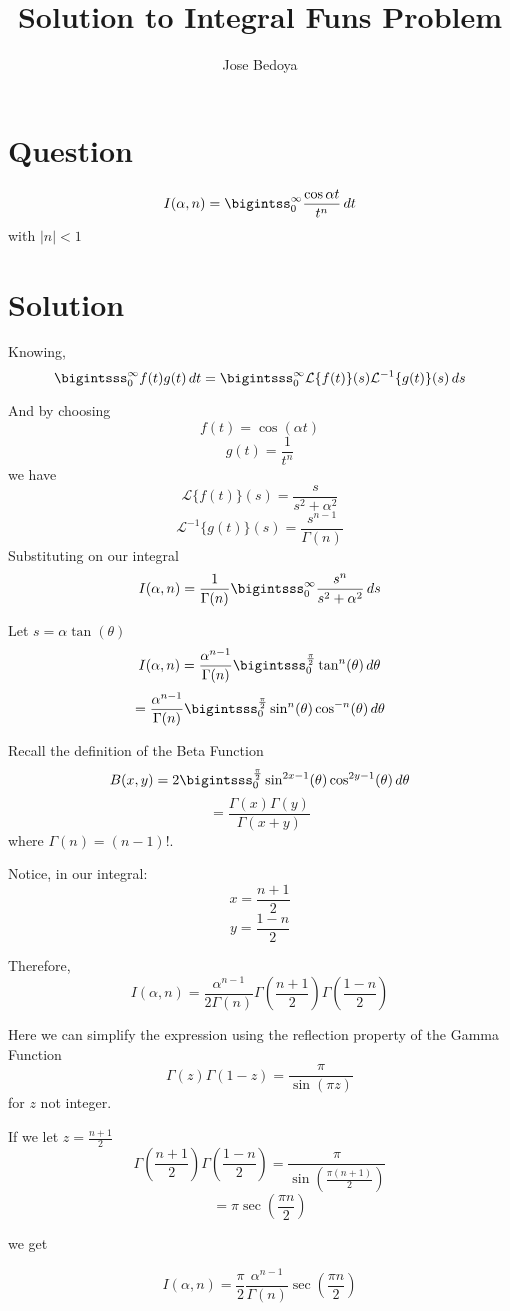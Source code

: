 \documentclass{article}
\begin{document}
\pagecolor{Blue}
\title{Solution to Integral Fun\textsc{}s Problem}
\author{Jose Bedoya}
\maketitle
\section{Question}
{\LARGE
$$I(\alpha,n)=\bigintss_{0}^{\infty} \frac{\cos \alpha t}{t^n}\,dt$$
with $\mid n \mid<1$
}
\section{Solution}
{\Large
Knowing,
$$\bigintsss_{0}^{\infty}f(t)g(t)\,dt=\bigintsss_{0}^{\infty}\mathcal{L}\{f(t)\}(s)\mathcal{L}^{-1}\{g(t)\}(s)\,ds$$

\vspace{5mm}
And by choosing
$$f(t)=\cos(\alpha t)$$
$$g(t)=\frac{1}{t^n}$$
we have
$$\mathcal{L}\{f(t)\}(s)=\frac{s}{s^2+\alpha^2}$$
$$\mathcal{L}^{-1}\{g(t)\}(s)=\frac{s^{n-1}}{\Gamma(n)}$$
\newpage
Substituting on our integral
$$I(\alpha,n)=\frac{1}{\Gamma(n)}\bigintsss_{0}^{\infty}\frac{s^n}{s^2+\alpha^2}\,ds$$

\vspace{3mm}
Let $s=\alpha\tan(\theta)$
$$I(\alpha,n)=\frac{\alpha^{n-1}}{\Gamma(n)}\bigintsss_{0}^{\frac{\pi}{2}}\tan^n(\theta)\,d\theta$$
$$=\frac{\alpha^{n-1}}{\Gamma(n)}\bigintsss_{0}^{\frac{\pi}{2}}\sin^n(\theta)\cos^{-n}(\theta)\,d\theta$$

\vspace{5mm}
Recall the definition of the Beta Function
$$B(x,y)=2\bigintsss_{0}^{\frac{\pi}{2}}\sin^{2x-1}(\theta)\cos^{2y-1}(\theta)\,d\theta$$
$$=\frac{\Gamma(x)\Gamma(y)}{\Gamma(x+y)}$$
where $\Gamma(n)=(n-1)$!.

\vspace{5mm}
Notice, in our integral:
$$x=\frac{n+1}{2}$$
$$y=\frac{1-n}{2}$$

\vspace{3mm}
Therefore,
$$I(\alpha,n)=\frac{\alpha^{n-1}}{2\Gamma(n)}\Gamma\left(\frac{n+1}{2}\right)\Gamma\left(\frac{1-n}{2}\right)$$

\vspace{3mm}
Here we can simplify the expression using the reflection property of the Gamma Function
$$\Gamma(z)\Gamma(1-z)=\frac{\pi}{\sin(\pi z)}$$
for $z$ not integer.

\vspace{3mm}
If we let $z=\frac{n+1}{2}$
$$\Gamma\left(\frac{n+1}{2}\right)\Gamma\left(\frac{1-n}{2}\right)=\frac{\pi}{\sin\left(\frac{\pi(n+1)}{2}\right)}$$
$$=\pi\sec\left(\frac{\pi n}{2}\right)$$

\vspace{2mm}
we get
}
{\LARGE
$$I(\alpha,n)=\frac{\pi}{2}\frac{\alpha^{n-1}}{\Gamma(n)}\sec\left(\frac{\pi n}{2}\right)$$
}
\end{document}
